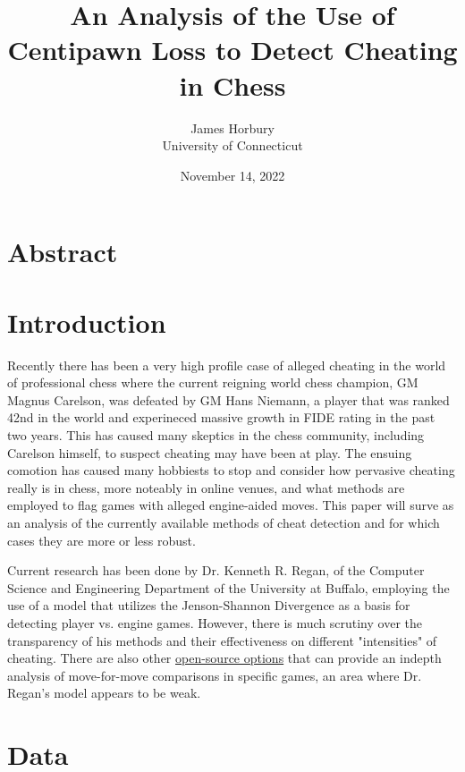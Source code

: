 \documentclass[12pt]{article}
\title{An Analysis of the Use of Centipawn Loss to Detect Cheating in Chess}
\author{James Horbury\\
    University of Connecticut
}
\date{November 14, 2022}
\begin{document}
\maketitle

\section*{Abstract}
\label{sec:abs}


\section*{Introduction}
\label{sec:intro}

Recently there has been a very high profile case of alleged cheating in the world of professional chess 
where the current reigning world chess champion, GM Magnus Carelson, was defeated by GM Hans Niemann, a player 
that was ranked 42nd in the world and experineced massive growth in FIDE rating in the past two years. This 
has caused many skeptics in the chess community, including Carelson himself, to suspect cheating may have been 
at play. The ensuing comotion has caused many hobbiests to stop and consider how pervasive cheating
really is in chess, more noteably in online venues, and what methods are employed to flag games with alleged 
engine-aided moves. This paper will surve as an analysis of the currently available methods of cheat detection 
and for which cases they are more or less robust.

Current research \citep{regan2011understanding} has been done by Dr. Kenneth R. Regan, of the Computer Science and Engineering Department of the University at Buffalo, employing the use of a model that utilizes the Jenson-Shannon Divergence as a basis for detecting player vs. engine games. However, there is much scrutiny over the transparency of his methods and their effectiveness on different "intensities" of cheating. There are also other \href{https://github.com/MGleason1/PGN-Spy}{open-source options} that can provide an indepth analysis of move-for-move comparisons in specific games, an area where Dr. Regan's model appears to be weak.

\section*{Data}
\label{sec:data}
\end{document}
